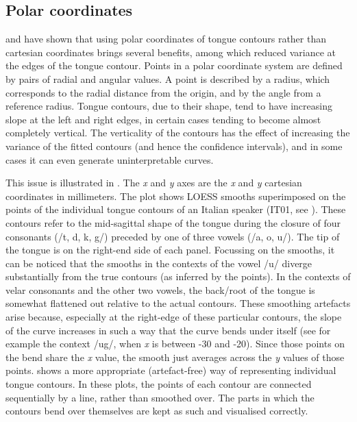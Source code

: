 \documentclass[12pt,]{article}
\begin{document}
\hypertarget{polar-coordinates}{%
\subsection{Polar coordinates}\label{polar-coordinates}}

\citet{mielke2015} and \citet{heyne2015a, heyne2015} have shown that
using polar coordinates of tongue contours rather than cartesian
coordinates brings several benefits, among which reduced variance at the
edges of the tongue contour. Points in a polar coordinate system are
defined by pairs of radial and angular values. A point is described by a
radius, which corresponds to the radial distance from the origin, and by
the angle from a reference radius. Tongue contours, due to their shape,
tend to have increasing slope at the left and right edges, in certain
cases tending to become almost completely vertical. The verticality of
the contours has the effect of increasing the variance of the fitted
contours (and hence the confidence intervals), and in some cases it can
even generate uninterpretable curves.

This issue is illustrated in . The \emph{x} and \emph{y}
axes are the \emph{x} and \emph{y} cartesian coordinates in millimeters.
The plot shows LOESS smooths superimposed on the points of the
individual tongue contours of an Italian speaker (IT01, see
). These contours refer to the mid-sagittal shape of the
tongue during the closure of four consonants (/t, d, k, g/) preceded by
one of three vowels (/a, o, u/). The tip of the tongue is on the
right-end side of each panel. Focussing on the smooths, it can be
noticed that the smooths in the contexts of the vowel /u/ diverge
substantially from the true contours (as inferred by the points). In the
contexts of velar consonants and the other two vowels, the back/root of
the tongue is somewhat flattened out relative to the actual contours.
These smoothing artefacts arise because, especially at the right-edge of
these particular contours, the slope of the curve increases in such a
way that the curve bends under itself (see for example the context /ug/,
when \emph{x} is between -30 and -20). Since those points on the bend
share the \emph{x} value, the smooth just averages across the \emph{y}
values of those points.  shows a more appropriate
(artefact-free) way of representing individual tongue contours. In these
plots, the points of each contour are connected sequentially by a line,
rather than smoothed over. The parts in which the contours bend over
themselves are kept as such and visualised correctly.
\end{document}
